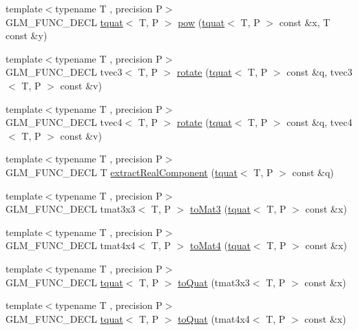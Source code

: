 \begin{DoxyCompactItemize}
{\footnotesize template$<$typename T , precision P$>$ }\\G\+L\+M\+\_\+\+F\+U\+N\+C\+\_\+\+D\+E\+C\+L \hyperlink{structglm_1_1tquat}{tquat}$<$ T, P $>$ \hyperlink{group__gtx__quaternion_ga42a0cf206c59eaeff4c67dd62e09a580}{pow} (\hyperlink{structglm_1_1tquat}{tquat}$<$ T, P $>$ const \&x, T const \&y)
\item 
{\footnotesize template$<$typename T , precision P$>$ }\\G\+L\+M\+\_\+\+F\+U\+N\+C\+\_\+\+D\+E\+C\+L tvec3$<$ T, P $>$ \hyperlink{group__gtx__quaternion_ga9f39f0d3ecd66839a4af44560aa10fb2}{rotate} (\hyperlink{structglm_1_1tquat}{tquat}$<$ T, P $>$ const \&q, tvec3$<$ T, P $>$ const \&v)
\item 
{\footnotesize template$<$typename T , precision P$>$ }\\G\+L\+M\+\_\+\+F\+U\+N\+C\+\_\+\+D\+E\+C\+L tvec4$<$ T, P $>$ \hyperlink{group__gtx__quaternion_ga96575f8868b3f2aa3e13cab9b94ccbd3}{rotate} (\hyperlink{structglm_1_1tquat}{tquat}$<$ T, P $>$ const \&q, tvec4$<$ T, P $>$ const \&v)
\item 
{\footnotesize template$<$typename T , precision P$>$ }\\G\+L\+M\+\_\+\+F\+U\+N\+C\+\_\+\+D\+E\+C\+L T \hyperlink{group__gtx__quaternion_ga90de879d97487ec804522dd418e5d8a0}{extract\+Real\+Component} (\hyperlink{structglm_1_1tquat}{tquat}$<$ T, P $>$ const \&q)
\item 
{\footnotesize template$<$typename T , precision P$>$ }\\G\+L\+M\+\_\+\+F\+U\+N\+C\+\_\+\+D\+E\+C\+L tmat3x3$<$ T, P $>$ \hyperlink{group__gtx__quaternion_ga01935b66ba245c2fd7dee5427d86ce9b}{to\+Mat3} (\hyperlink{structglm_1_1tquat}{tquat}$<$ T, P $>$ const \&x)
\item 
{\footnotesize template$<$typename T , precision P$>$ }\\G\+L\+M\+\_\+\+F\+U\+N\+C\+\_\+\+D\+E\+C\+L tmat4x4$<$ T, P $>$ \hyperlink{group__gtx__quaternion_gaedc9fba6485eade37cc26c16df9d7aad}{to\+Mat4} (\hyperlink{structglm_1_1tquat}{tquat}$<$ T, P $>$ const \&x)
\item 
{\footnotesize template$<$typename T , precision P$>$ }\\G\+L\+M\+\_\+\+F\+U\+N\+C\+\_\+\+D\+E\+C\+L \hyperlink{structglm_1_1tquat}{tquat}$<$ T, P $>$ \hyperlink{group__gtx__quaternion_gac9e3109ca60b644ce508d6b71a1697bc}{to\+Quat} (tmat3x3$<$ T, P $>$ const \&x)
\item 
{\footnotesize template$<$typename T , precision P$>$ }\\G\+L\+M\+\_\+\+F\+U\+N\+C\+\_\+\+D\+E\+C\+L \hyperlink{structglm_1_1tquat}{tquat}$<$ T, P $>$ \hyperlink{group__gtx__quaternion_ga808dd0f83ee8150db7e652313bde8eb2}{to\+Quat} (tmat4x4$<$ T, P $>$ const \&x)

\end{DoxyCompactItemize}
